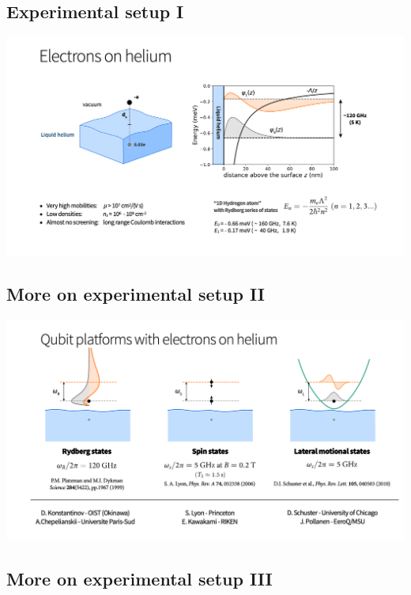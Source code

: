 \documentclass[%
oneside,                 %
final,                   %
10pt]{article}
\begin{document}
\noindent
\subsection{Experimental setup I}

\vspace{6mm}

\centerline{\includegraphics[width=1.3\linewidth]{qcfigures/Elhelium1.png}}

\vspace{6mm}

\subsection{More on experimental setup II}

\vspace{6mm}

\centerline{\includegraphics[width=1.3\linewidth]{qcfigures/Elhelium2.png}}

\vspace{6mm}

\subsection{More on experimental setup III}
\end{document}
